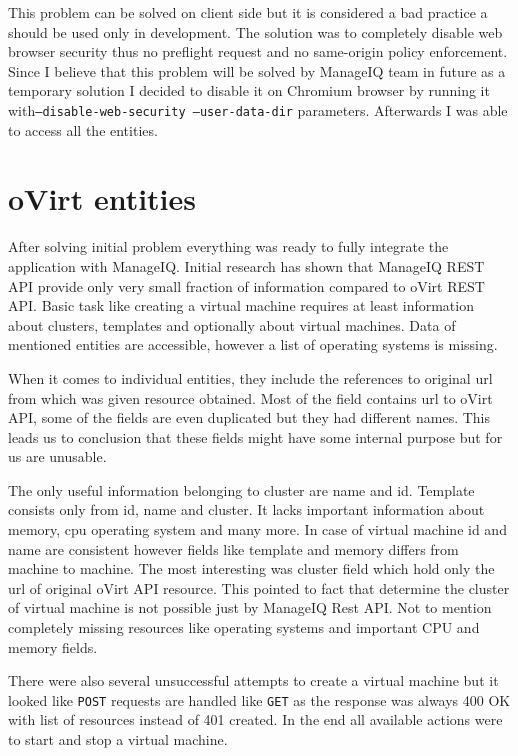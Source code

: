 This problem can be solved on client side but it is considered a bad practice a should be used only in development. The solution was to completely disable web browser security thus no preflight request and no same-origin policy enforcement. Since I believe that this problem will be solved by ManageIQ team in future as a temporary solution I decided to disable it on Chromium browser by running it with\texttt{--disable-web-security --user-data-dir} parameters. Afterwards I was able to access all the entities.

\section{oVirt entities}
After solving initial problem everything was ready to fully integrate the application with ManageIQ. Initial research has shown that ManageIQ REST API provide only very small fraction of information compared to oVirt REST API.
Basic task like creating a virtual machine requires at least information about clusters, templates and optionally about virtual machines. Data of mentioned entities are accessible, however a list of operating systems is missing. 

When it comes to individual entities, they include the references to original url from which was given resource obtained. Most of the field contains url to oVirt API, some of the fields are even duplicated but they had different names. This leads us to conclusion that these fields might have some internal purpose but for us are unusable. 

The only useful information belonging to cluster are name and id. Template consists only from id, name and cluster. It lacks important information about memory, cpu operating system and many more. In case of virtual machine id and name are consistent however fields like template and memory differs from machine to machine.  The most interesting was cluster field which hold only the url of original oVirt API resource. This pointed to fact that determine the cluster of virtual machine is not possible just by ManageIQ Rest API. Not to mention completely missing resources like operating systems and important CPU and memory fields.

There were also several unsuccessful attempts to create a virtual machine but it looked like \texttt{POST} requests are handled like \texttt{GET} as the response was always 400 OK with list of resources instead of 401 created. In the end all available actions were to start and stop a virtual machine.

